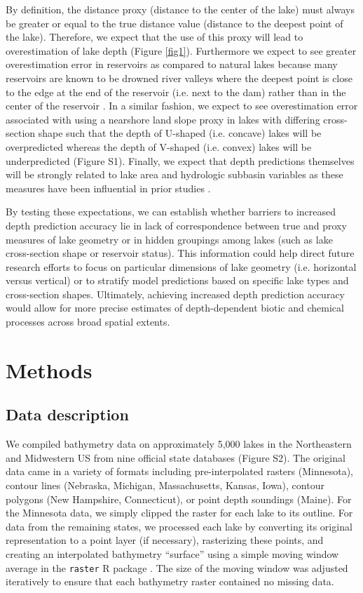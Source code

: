 \documentclass[draft]{agujournal2019}
\begin{document}
By definition, the distance proxy (distance to the center of the lake) must always be greater or equal to the true distance value (distance to the deepest point of the lake). Therefore, we expect that the use of this proxy will lead to overestimation of lake depth (Figure \ref{fig1}). Furthermore we expect to see greater overestimation error in reservoirs as compared to natural lakes because many reservoirs are known to be drowned river valleys where the deepest point is close to the edge at the end of the reservoir (i.e. next to the dam) rather than in the center of the reservoir \cite{lanza1985interactions}. In a similar fashion, we expect to see overestimation error associated with using a nearshore land slope proxy in lakes with differing cross-section shape such that the depth of U-shaped (i.e. concave) lakes will be overpredicted whereas the depth of V-shaped (i.e. convex) lakes will be underpredicted (Figure S1). Finally, we expect that depth predictions themselves will be strongly related to lake area and hydrologic subbasin variables as these measures have been influential in prior studies \cite{oliver2016prediction}.

By testing these expectations, we can establish whether barriers to increased depth prediction accuracy lie in lack of correspondence between true and proxy measures of lake geometry or in hidden groupings among lakes (such as lake cross-section shape or reservoir status). This information could help direct future research efforts to focus on particular dimensions of lake geometry (i.e. horizontal versus vertical) or to stratify model predictions based on specific lake types and cross-section shapes. Ultimately, achieving increased depth prediction accuracy would allow for more precise estimates of depth-dependent biotic and chemical processes across broad spatial extents.

\section{Methods}
\subsection{Data description}
\noindent
We compiled bathymetry data on approximately 5,000 lakes in the Northeastern and Midwestern US from nine official state databases (Figure S2). The original data came in a variety of formats including pre-interpolated rasters (Minnesota), contour lines (Nebraska, Michigan, Massachusetts, Kansas, Iowa), contour polygons (New Hampshire, Connecticut), or point depth soundings (Maine). For the Minnesota data, we simply clipped the raster for each lake to its outline. For data from the remaining states, we processed each lake by converting its original representation to a point layer (if necessary), rasterizing these points, and creating an interpolated bathymetry “surface” using a simple moving window average in the \texttt{raster} R package \cite{hijmansRasterGeographicData2019}. The size of the moving window was adjusted iteratively to ensure that each bathymetry raster contained no missing data.
\end{document}
